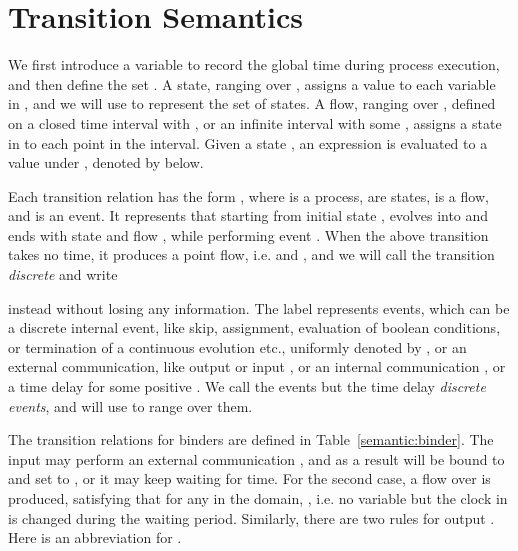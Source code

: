 \documentclass{llncs}
\begin{document}
  \section{Transition Semantics}
\label{sec:semantics}
We first introduce a variable  to record the global time during process execution, and then
define the set .
A state, ranging over ,  assigns a value to each variable in
, and we will use  to represent the set of states.
A flow, ranging over , defined on a closed time interval  with ,
or an infinite interval  with some ,
assigns a state in  to each point in the interval.
Given a state , an expression  is evaluated to a value under , denoted by  below.



Each transition relation has the form ,
where  is a process,  are states,  is a flow, and  is an event. It represents that
starting from initial state ,  evolves into  and ends with state  and flow , while
performing event . When the above transition takes no time, it produces a point flow,
i.e.  and
, and we will call the transition \emph{discrete} and write

instead without losing any information.
The label  represents
events, which can be a discrete internal event,
like skip, assignment, evaluation of boolean conditions, or termination of a continuous evolution etc.,
uniformly denoted by , or an external communication, like output  or input ,
or an internal communication , or a time delay  for some positive .
We call the events but the time delay \emph{discrete events}, and will use  to range over them.


The transition relations for binders are defined in Table~\ref{semantic:binder}.
The input  may perform an external communication
,  and as a result   will be
bound to  and  set to , or
it may keep waiting for   time. For
the second case, a flow  over  is produced, satisfying that
 for any  in the domain, , i.e. no variable but the clock  in 
is changed during the waiting period. Similarly, there are two rules for output . Here
  is an abbreviation for .
\end{document}
